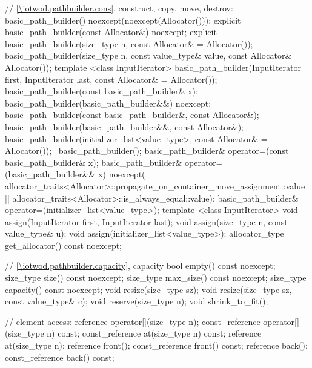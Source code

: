 \begin{codeblock}
{{    // \ref{\iotwod.pathbuilder.cons}, construct, copy, move, destroy:
    basic_path_builder() noexcept(noexcept(Allocator()));
    explicit basic_path_builder(const Allocator&) noexcept;
    explicit basic_path_builder(size_type n, const Allocator& = Allocator());
    basic_path_builder(size_type n, const value_type& value, const Allocator& = Allocator());
    template <class InputIterator>
    basic_path_builder(InputIterator first, InputIterator last, const Allocator& = Allocator());
    basic_path_builder(const basic_path_builder& x);
    basic_path_builder(basic_path_builder&&) noexcept;
    basic_path_builder(const basic_path_builder&, const Allocator&);
    basic_path_builder(basic_path_builder&&, const Allocator&);
    basic_path_builder(initializer_list<value_type>, const Allocator& = Allocator());
    ~basic_path_builder();
    basic_path_builder& operator=(const basic_path_builder& x);
    basic_path_builder& operator=(basic_path_builder&& x) noexcept(
      allocator_traits<Allocator>::propagate_on_container_move_assignment::value ||
      allocator_traits<Allocator>::is_always_equal::value);
    basic_path_builder& operator=(initializer_list<value_type>);
    template <class InputIterator>
    void assign(InputIterator first, InputIterator last);
    void assign(size_type n, const value_type& u);
    void assign(initializer_list<value_type>);
    allocator_type get_allocator() const noexcept;

    // \ref{\iotwod.pathbuilder.capacity}, capacity
    bool empty() const noexcept;
    size_type size() const noexcept;
    size_type max_size() const noexcept;
    size_type capacity() const noexcept;
    void resize(size_type sz);
    void resize(size_type sz, const value_type& c);
    void reserve(size_type n);
    void shrink_to_fit();

    // element access:
    reference operator[](size_type n);
    const_reference operator[](size_type n) const;
    const_reference at(size_type n) const;
    reference at(size_type n);
    reference front();
    const_reference front() const;
    reference back();
    const_reference back() const;

}}
\end{codeblock}
